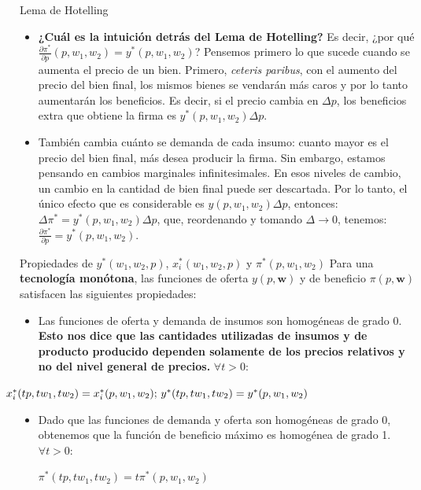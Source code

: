 \documentclass{beamer}
\theoremstyle{definition}
\begin{document}
\begin{frame}{Lema de Hotelling}\small
\begin{itemize}

\item \textbf{¿Cu\'al es la intuici\'{o}n detr\'{a}s del Lema de Hotelling?} \small Es decir, ¿por qu\'{e} $\frac{\partial \pi^* }{\partial p}(p,w_{1},w_{2})=y^*(p,w_{1},w_{2})$? Pensemos primero lo que sucede cuando se aumenta el precio de un bien. Primero, \textit{ceteris paribus}, con el aumento del precio del bien final, los mismos bienes se vendarán m\'{a}s caros y por lo tanto aumentar\'{a}n los beneficios. Es decir, si el precio cambia en $\Delta p$, los beneficios extra que obtiene la firma es $y^*(p,w_{1},w_{2})\Delta p$.

\vspace{12pt}

\item Tambi\'en cambia cuánto se demanda de cada insumo: cuanto mayor es el precio del bien final, más desea producir la firma. Sin embargo, estamos pensando en cambios marginales infinitesimales. En esos niveles de cambio, un cambio en la cantidad de bien final puede ser descartada. Por lo tanto, el \'{u}nico efecto que es considerable es $y(p,w_{1},w_{2})\Delta p$, entonces: $\Delta \pi ^{\ast}=y^*(p,w_{1},w_{2})\Delta p$, que, reordenando y tomando $\Delta\rightarrow 0$, tenemos: $\frac{\partial \pi ^{\ast }}{\partial p}=y^*(p,w_{1},w_{2})$.
\end{itemize}
\end{frame}



\begin{frame}{\small Propiedades de $y^*(w_1, w_2,p)$, $x_i^*(w_1, w_2,p)$ y $\pi^* (p,w_{1},w_{2})$}	
Para una \textbf{tecnología monótona}, las funciones de oferta $y(p,\textbf{w})$ y de beneficio $\pi(p,\textbf{w})$ satisfacen las siguientes
propiedades:
\begin{itemize}
\item \color{cyan} Las funciones de oferta y demanda de insumos son homog\'{e}neas de grado 0. \color{black}\textbf{Esto nos dice que las cantidades utilizadas de insumos y de producto producido dependen solamente de los precios relativos y no del nivel general de precios.} $\forall t>0$:
\begin{center}
$\hspace{-3em}x_{i}^*(tp,tw_{1},tw_{2})=x_{i}^*(p,w_{1},w_{2}); \, y^*(tp,tw_{1},tw_{2})=y^*(p,w_{1},w_{2})$
\end{center}
\item \color{rosee}Dado que las funciones de demanda y oferta son homog\'{e}neas de grado
0, obtenemos que la funci\'{o}n de beneficio m\'{a}ximo es homog\'{e}nea de grado 1. \color{black} $\forall t>0$: 
\begin{center}
$\pi^* (tp,tw_{1},tw_{2})=t\pi^* (p,w_{1},w_{2})$
\end{center}

\end{itemize}
\end{frame}
\end{document}
